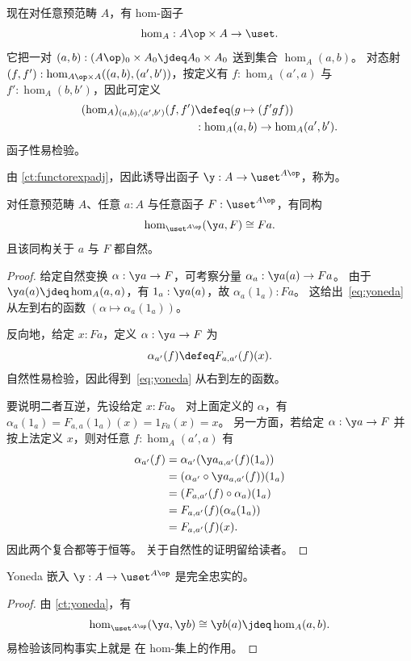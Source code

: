 现在对任意预范畴 $A$，有 hom-函子
%
\[\hom_A : A\op \times A \to \uset.\]
它把一对 $(a,b): (A\op)_0 \times A_0 \jdeq A_0 \times A_0$ 送到集合 $\hom_A(a,b)$。
对态射 $(f,f') : \hom_{A\op\times A}((a,b),(a',b'))$，按定义有 $f:\hom_A(a',a)$ 与 $f':\hom_A(b,b')$，因此可定义
\begin{align*}
  (\hom_A)_{(a,b),(a',b')}(f,f')
  &\defeq (g \mapsto (f'gf))\\
  &: \hom_A(a,b) \to \hom_A(a',b').
\end{align*}
函子性易检验。

由 \cref{ct:functorexpadj}，因此诱导出函子 $\y:A\to \uset^{A\op}$，称为。
%
%

\begin{thm}[Yoneda 引理]\label{ct:yoneda}
  对任意预范畴 $A$、任意 $a:A$ 与任意函子 $F:\uset^{A\op}$，有同构
  \begin{equation}\label{eq:yoneda}
    \hom_{\uset^{A\op}}(\y a, F) \cong Fa.
  \end{equation}
  且该同构关于 $a$ 与 $F$ 都自然。
\end{thm}
\begin{proof}
  给定自然变换 $\alpha:\y a \to F$，可考察分量 $\alpha_a : \y a(a) \to F a$。
  由于 $\y a(a)\jdeq \hom_A(a,a)$，有 $1_a : \y a(a)$，故 $\alpha_a(1_a) : F a$。
  这给出~\eqref{eq:yoneda} 从左到右的函数 $(\alpha \mapsto \alpha_a(1_a))$。

  反向地，给定 $x:F a$，定义 $\alpha:\y a \to F$ 为
  \[\alpha_{a'}(f) \defeq F_{a,a'}(f)(x). \]
  自然性易检验，因此得到~\eqref{eq:yoneda} 从右到左的函数。

  要说明二者互逆，先设给定 $x:F a$。
  对上面定义的 $\alpha$，有 $\alpha_a(1_a) = F_{a,a}(1_a)(x) = 1_{F a}(x) = x$。
  另一方面，若给定 $\alpha:\y a \to F$ 并按上法定义 $x$，则对任意 $f:\hom_A(a',a)$ 有
  \begin{align*}
    \alpha_{a'}(f)
    &= \alpha_{a'} (\y a_{a,a'}(f)(1_a))\\
    &= (\alpha_{a'}\circ \y a_{a,a'}(f))(1_a)\\
    &= (F_{a,a'}(f)\circ \alpha_a)(1_a)\\
    &= F_{a,a'}(f)(\alpha_a(1_a))\\
    &= F_{a,a'}(f)(x).
  \end{align*}
  因此两个复合都等于恒等。
  关于自然性的证明留给读者。
\end{proof}

\begin{cor}\label{ct:yoneda-embedding}
  Yoneda 嵌入 $\y :A\to \uset^{A\op}$ 是完全忠实的。
\end{cor}
\begin{proof}
  由 \cref{ct:yoneda}，有
  \[ \hom_{\uset^{A\op}}(\y a, \y b) \cong \y b(a) \jdeq \hom_A(a,b). \]
  易检验该同构事实上就是 \y 在 hom-集上的作用。
\end{proof}

